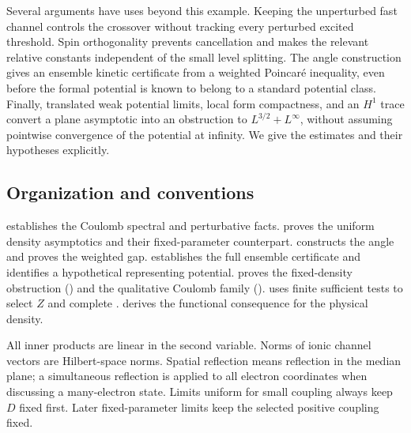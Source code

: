 \documentclass[11pt,a4paper]{article}
\theoremstyle{definition}
\theoremstyle{remark}
\numberwithin{equation}{section}
\begin{document}
Several arguments have uses beyond this example.
Keeping the unperturbed fast channel controls the crossover without
tracking every perturbed excited threshold. Spin orthogonality
prevents cancellation and makes the relevant relative constants
independent of the small level splitting.
The angle construction gives an ensemble kinetic certificate from
a weighted Poincar\'e inequality, even before the formal potential
is known to belong to a standard potential class.
Finally, translated weak potential limits, local form compactness,
and an \(H^1\) trace convert a plane asymptotic into an obstruction
to \(L^{3/2}+L^\infty\), without assuming pointwise convergence of
the potential at infinity. We give the estimates and their
hypotheses explicitly.

\subsection{Organization and conventions}

 establishes the Coulomb spectral and perturbative
facts.  proves the uniform density asymptotics
and their fixed-parameter counterpart.
 constructs the angle and proves the weighted gap.
 establishes the full ensemble certificate and
identifies a hypothetical representing potential.
 proves the fixed-density obstruction
() and the qualitative Coulomb family
().
 uses finite sufficient tests to select \(Z\)
and complete .
 derives the functional consequence
for the physical density.

All inner products are linear in the second variable.
Norms of ionic channel vectors are Hilbert-space norms.
Spatial reflection means reflection in the median plane; a
simultaneous reflection is applied to all electron coordinates
when discussing a many-electron state. Limits uniform for small
coupling always keep \(D\) fixed first. Later fixed-parameter
limits keep the selected positive coupling fixed.









\end{document}
